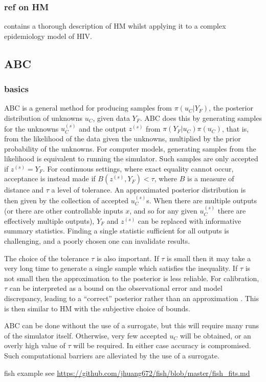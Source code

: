 \documentclass[nopagenumber,9pt]{beamer}
\begin{document}
\begin{frame}
 \frametitle{ref on HM}
 \cite{Andrianakis2015bayesian} contains a thorough description of HM whilst applying it to a complex epidemiology model of HIV.
\end{frame}

\subsection{ABC}

\begin{frame}
 \frametitle{basics}
 ABC is a general method for producing samples from $\pi(u_C | Y_F)$, the posterior distribution of unknowns $u_C$, given data $Y_F$. ABC does this by generating samples for the unknowns $u_C^{(s)}$ and the output $z^{(s)}$ from $\pi(Y_F | u_C)\pi(u_C)$, that is, from the likelihood of the data given the unknowns, multiplied by the prior probability of the unknowns. For computer models, generating samples from the likelihood is equivalent to running the simulator. Such samples are only accepted if $z^{(s)} = Y_F$. For continuous settings, where exact equality cannot occur, acceptance is instead made if $B(z^{(s)}, Y_F) < \tau$, where $B$ is a measure of distance and $\tau$ a level of tolerance. An approximated posterior distribution is then given by the collection of accepted $u_C^{(s)}$s. When there are multiple outputs (or there are other controllable inputs $x$, and so for any given $u_C^{(s)}$ there are effectively multiple outputs), $Y_F$ and $z^{(s)}$ can be replaced with informative summary statistics. Finding a single statistic sufficient for all outputs is challenging, and a poorly chosen one can invalidate results. 

The choice of the tolerance $\tau$ is also important. If $\tau$ is small then it may take a very long time to generate a single sample which satisfies the inequality. If $\tau$ is not small then the approximation to the posterior is less reliable. For calibration, $\tau$ can be interpreted as a bound on the observational error and model discrepancy, leading to a ``correct'' posterior rather than an approximation \cite{wilkinson2013approximate}. This is then similar to HM with the subjective choice of bounds. 

ABC can be done without the use of a surrogate, but this will require many runs of the simulator itself. Otherwise, very few accepted $u_C$ will be obtained, or an overly high value of $\tau$ will be required. In either case accuracy is compromised. Such computational barriers are alleviated by the use of a surrogate.


\end{frame}



\begin{frame}
fish example see \url{https://github.com/jhuang672/fish/blob/master/fish_fits.md}

\end{frame}




\end{document}
